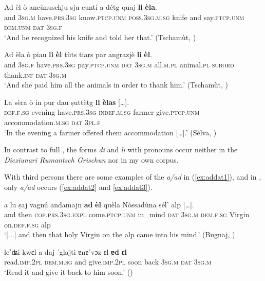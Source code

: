 \ea\label{ex:datpron4}
\gll  Ad èl ò ancùnuschju sju cuntí a détg quaj \textbf{li} \textbf{èla}. \\
 and 3\textsc{sg.m} have.\textsc{prs.3sg} know.\textsc{ptcp.unm}  \textsc{poss.3sg.m.sg} knife and say.\textsc{ptcp.unm} \textsc{dem.unm} \textsc{dat} \textsc{3sg.f}\\
\glt `And he recognized his knife and told her that.' (Tschamùt, \citealt[14]{Büchli1966})
\z
 
\ea\label{ex:datpron5}
\gll  Ad èla ò piau \textbf{li} \textbf{èl} tùts tiars par angrazjè \textbf{li} \textbf{èl}.\\
     and 3\textsc{sg}.\textsc{f} have.\textsc{prs}.3\textsc{sg} pay.\textsc{ptcp.unm} \textsc{dat} 3\textsc{sg}.\textsc{m} all.\textsc{m}.\textsc{pl} animal.\textsc{pl} \textsc{subord} thank.\textsc{inf} \textsc{dat} 3\textsc{sg}.\textsc{m}\\
\glt `And she paid him all the animals in order to thank him.' (Tschamùt, \citealt[14]{Büchli1966})
\z

\ea\label{ex:datpron6}
\gll  La sèra ò in pur dau ṣuttètg \textbf{li} \textbf{èlas} […].\\
     \textsc{def.f.sg} evening have.\textsc{prs}.3\textsc{sg} \textsc{indef.m.sg} farmer give.\textsc{ptcp.unm} accommodation.\textsc{m.sg} \textsc{dat} \textsc{3pl.f}\\
\glt `In the evening a farmer offered them accommodation […].' (Sèlva, \citealt[53]{Büchli1966})
\z

In contrast to full , the forms \textit{di} and \textit{li} with pronouns occur neither in the \textit{Dicziunari Rumantsch Grischun} nor in my own corpus.

With third persons there are some examples of the   \textit{a/ad} in \citet{Büchli1966} (\ref{ex:addat1}), and in \citet{Gartner1910}, only \textit{a/ad} occurs (\ref{ex:addat2} and \ref{ex:addat3}).

\ea\label{ex:addat1}
\gll  […] a lu ṣaj vagnú andamajn \textbf{ad} \textbf{èl} quèla Nòssadùna sél’ alp […].\\
{} and then \textsc{cop.prs.3sg.expl} come.\textsc{ptcp.unm} in\_mind \textsc{dat} \textsc{3sg.m} \textsc{dem.f.sg} Virgin on.\textsc{def.f.sg} alp \\
\glt `[...] and then that holy Virgin on the alp came into his mind.' (Bugnaj, \citealt[145]{Büchli1966})
\z

\ea\label{ex:addat2}
\gll leˈʥi kwɛl a daj ˈglajti ɐnɐˈvɔz ɛl \textbf{ɐd} \textbf{ɛl}\\
     read.\textsc{imp.2pl} \textsc{dem.m.sg} and give.\textsc{imp.2pl} soon back \textsc{3sg.m} \textsc{dat} \textsc{3sg.m}\\
\glt `Read it and give it back to him soon.' (\citealt[33]{Gartner1910})
\z

